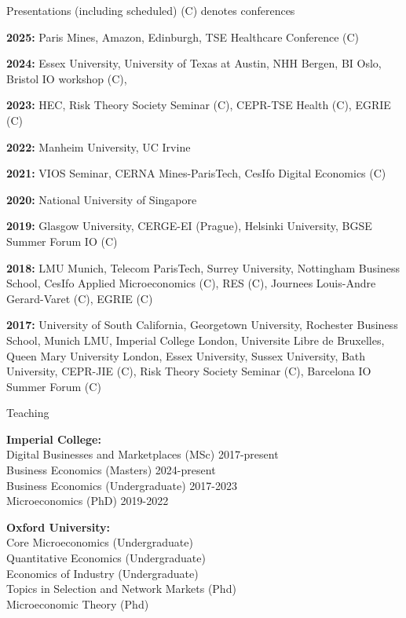 \documentclass{resume}
\begin{document}
\begin{rSection}{Presentations (including scheduled) \tiny{(C) denotes conferences}}

\textbf{2025:} Paris Mines, Amazon, Edinburgh, TSE Healthcare Conference (C)

\textbf{2024:} Essex University, University of Texas at Austin, NHH Bergen, BI Oslo, Bristol IO workshop (C),

\textbf{2023:} HEC,  Risk Theory Society Seminar (C), CEPR-TSE Health (C), EGRIE (C)

\textbf{2022:} Manheim University, UC Irvine

\textbf{2021:} VIOS Seminar, CERNA Mines-ParisTech, CesIfo Digital Economics (C)

\textbf{2020:} National University of Singapore

\textbf{2019:} Glasgow University, CERGE-EI (Prague), Helsinki University, BGSE Summer Forum IO (C)

\textbf{2018:} LMU Munich, Telecom ParisTech, Surrey University, Nottingham Business School, CesIfo Applied Microeconomics (C), RES (C), Journees Louis-Andre Gerard-Varet (C), EGRIE (C)

\textbf{2017:} University of South California, Georgetown University, Rochester Business School, Munich LMU, Imperial College London, Universite Libre de Bruxelles, Queen Mary University London, Essex University, Sussex University, Bath University, CEPR-JIE (C), Risk Theory Society Seminar (C), Barcelona IO Summer Forum (C) 

\end{rSection}


\begin{rSection}{Teaching}

\textbf{Imperial College:} \\ 
Digital Businesses and Marketplaces (MSc) \hfill {2017-present} \\ 
Business Economics (Masters) \hfill {2024-present} \\ 
Business Economics (Undergraduate) \hfill {2017-2023} \\  
Microeconomics (PhD) \hfill {2019-2022}

\textbf{Oxford University:} \\
Core Microeconomics (Undergraduate) \\ 
Quantitative Economics (Undergraduate) \\ 
Economics of Industry (Undergraduate) \\ 
Topics in Selection and Network Markets (Phd) \\ 
Microeconomic Theory (Phd)

\end{rSection}
\end{document}
